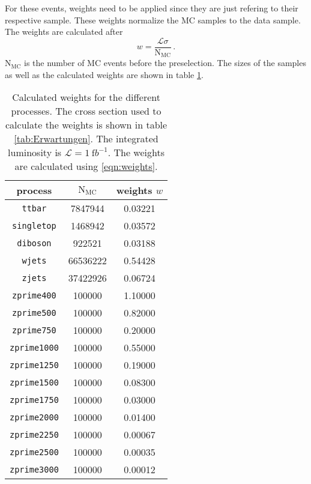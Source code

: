 For these events, weights need to be applied since they are just refering to their respective sample.
These weights normalize the MC samples to the data sample.
The weights are calculated after
\begin{equation}
w = \frac{\mathcal{L} \sigma}{\text{N}_\text{MC}}\,.
\label{eqn:weights}
\end{equation}
$\text{N}_\text{MC}$ is the number of MC events before the preselection.
The sizes of the samples as well as the calculated weights are shown in table \ref{tab:weights}.

\begin{table}[H]
    \centering
    \caption{Calculated weights for the different processes. The cross section used to calculate the weights is shown in table  \ref{tab:Erwartungen}. The integrated luminosity is $\mathcal{L} = \SI{1}{\femto b}^{-1}$. The weights are calculated using \eqref{eqn:weights}.}
    \label{tab:weights}
    \begin{tabular}{c|cc}
    \toprule
    process & $\text{N}_\text{MC}$ & weights $w$ \\
    \midrule
    \texttt{ttbar}      & 7847944    & 0.03221     \\
    \texttt{singletop}  & 1468942    & 0.03572     \\
    \texttt{diboson}    & 922521     & 0.03188     \\
    \texttt{wjets}      & 66536222   & 0.54428     \\
    \texttt{zjets}      & 37422926   & 0.06724     \\
    \texttt{zprime400}  & 100000     & 1.10000     \\
    \texttt{zprime500}  & 100000     & 0.82000     \\
    \texttt{zprime750}  & 100000     & 0.20000     \\
    \texttt{zprime1000} & 100000     & 0.55000     \\
    \texttt{zprime1250} & 100000     & 0.19000     \\
    \texttt{zprime1500} & 100000     & 0.08300     \\
    \texttt{zprime1750} & 100000     & 0.03000     \\
    \texttt{zprime2000} & 100000     & 0.01400     \\
    \texttt{zprime2250} & 100000     & 0.00067     \\
    \texttt{zprime2500} & 100000     & 0.00035     \\
    \texttt{zprime3000} & 100000     & 0.00012     \\
    \bottomrule
    \end{tabular}
\end{table}

